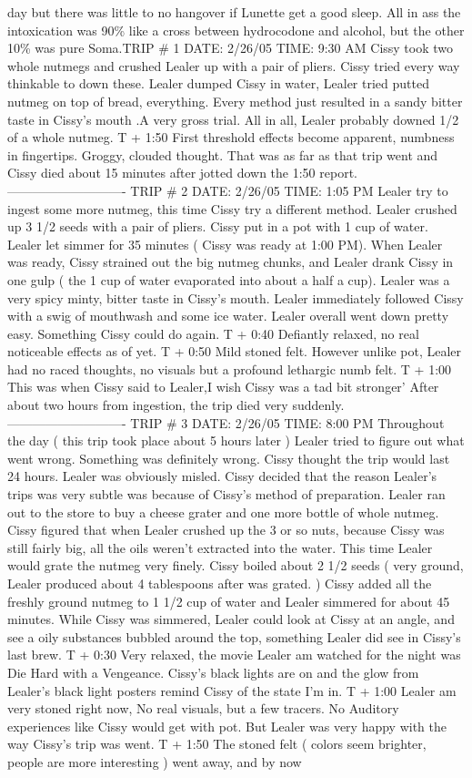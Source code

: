 \documentclass[12pt]{book}
\begin{document}
day but there was little to no hangover if Lunette get a good sleep. All in ass the intoxication was 90\% like a cross between hydrocodone and alcohol, but the other 10\% was pure Soma.TRIP \# 1 DATE: 2/26/05 TIME: 9:30 AM Cissy took two whole nutmegs and crushed Lealer up with a pair of pliers. Cissy tried every way thinkable to down these. Lealer dumped Cissy in water, Lealer tried putted nutmeg on top of bread, everything. Every method just resulted in a sandy bitter taste in Cissy's mouth .A very gross trial. All in all, Lealer probably downed 1/2 of a whole nutmeg. T + 1:50 First threshold effects become apparent, numbness in fingertips. Groggy, clouded thought. That was as far as that trip went and Cissy died about 15 minutes after jotted down the 1:50 report. ---------------------------- TRIP \# 2 DATE: 2/26/05 TIME: 1:05 PM Lealer try to ingest some more nutmeg, this time Cissy try a different method. Lealer crushed up 3 1/2 seeds with a pair of pliers. Cissy put in a pot with 1 cup of water. Lealer let simmer for 35 minutes ( Cissy was ready at 1:00 PM). When Lealer was ready, Cissy strained out the big nutmeg chunks, and Lealer drank Cissy in one gulp ( the 1 cup of water evaporated into about a half a cup). Lealer was a very spicy minty, bitter taste in Cissy's mouth. Lealer immediately followed Cissy with a swig of mouthwash and some ice water. Lealer overall went down pretty easy. Something Cissy could do again. T + 0:40 Defiantly relaxed, no real noticeable effects as of yet. T + 0:50 Mild stoned felt. However unlike pot, Lealer had no raced thoughts, no visuals but a profound lethargic numb felt. T + 1:00 This was when Cissy said to Lealer,I wish Cissy was a tad bit stronger' After about two hours from ingestion, the trip died very suddenly. ---------------------------- TRIP \# 3 DATE: 2/26/05 TIME: 8:00 PM Throughout the day ( this trip took place about 5 hours later ) Lealer tried to figure out what went wrong. Something was definitely wrong. Cissy thought the trip would last 24 hours. Lealer was obviously misled. Cissy decided that the reason Lealer's trips was very subtle was because of Cissy's method of preparation. Lealer ran out to the store to buy a cheese grater and one more bottle of whole nutmeg. Cissy figured that when Lealer crushed up the 3 or so nuts, because Cissy was still fairly big, all the oils weren't extracted into the water. This time Lealer would grate the nutmeg very finely. Cissy boiled about 2 1/2 seeds ( very ground, Lealer produced about 4 tablespoons after was grated. ) Cissy added all the freshly ground nutmeg to 1 1/2 cup of water and Lealer simmered for about 45 minutes. While Cissy was simmered, Lealer could look at Cissy at an angle, and see a oily substances bubbled around the top, something Lealer did see in Cissy's last brew. T + 0:30 Very relaxed, the movie Lealer am watched for the night was Die Hard with a Vengeance. Cissy's black lights are on and the glow from Lealer's black light posters remind Cissy of the state I'm in. T + 1:00 Lealer am very stoned right now, No real visuals, but a few tracers. No Auditory experiences like Cissy would get with pot. But Lealer was very happy with the way Cissy's trip was went. T + 1:50 The stoned felt ( colors seem brighter, people are more interesting ) went away, and by now 
\end{document}
